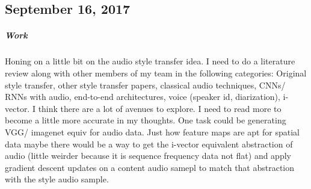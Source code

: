 \documentclass[a4paper]{article}
\begin{document}
\subsection{September 16, 2017}
\subparagraph{Work}
Honing on a little bit on the audio style transfer idea. I need to do a literature review along with other members of my team in the following categories: Original style transfer, other style transfer papers, classical audio techniques, CNNs/ RNNs with audio, end-to-end architectures, voice (speaker id, diarization), i-vector. I think there are a lot of avenues to explore. I need to read more to become a little more accurate in my thoughts. One task could be generating VGG/ imagenet equiv for audio data. Just how feature maps are apt for spatial data maybe there would be a way to get the i-vector equivalent abstraction of audio (little weirder because it is sequence frequency data not flat) and apply gradient descent updates on a content audio samepl to match that abstraction with the style audio sample.
\end{document}

